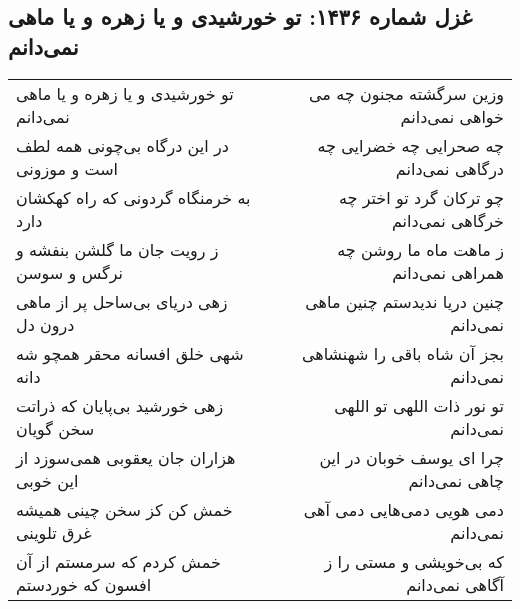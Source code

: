 \begin{center}
\section*{غزل شماره ۱۴۳۶: تو خورشیدی و یا زهره و یا ماهی نمی‌دانم}
\label{sec:1436}
\begin{longtable}{l p{0.5cm} r}
تو خورشیدی و یا زهره و یا ماهی نمی‌دانم
&&
وزین سرگشته مجنون چه می خواهی نمی‌دانم
\\
در این درگاه بی‌چونی همه لطف است و موزونی
&&
چه صحرایی چه خضرایی چه درگاهی نمی‌دانم
\\
به خرمنگاه گردونی که راه کهکشان دارد
&&
چو ترکان گرد تو اختر چه خرگاهی نمی‌دانم
\\
ز رویت جان ما گلشن بنفشه و نرگس و سوسن
&&
ز ماهت ماه ما روشن چه همراهی نمی‌دانم
\\
زهی دریای بی‌ساحل پر از ماهی درون دل
&&
چنین دریا ندیدستم چنین ماهی نمی‌دانم
\\
شهی خلق افسانه محقر همچو شه دانه
&&
بجز آن شاه باقی را شهنشاهی نمی‌دانم
\\
زهی خورشید بی‌پایان که ذراتت سخن گویان
&&
تو نور ذات اللهی تو اللهی نمی‌دانم
\\
هزاران جان یعقوبی همی‌سوزد از این خوبی
&&
چرا ای یوسف خوبان در این چاهی نمی‌دانم
\\
خمش کن کز سخن چینی همیشه غرق تلوینی
&&
دمی هویی دمی‌هایی دمی آهی نمی‌دانم
\\
خمش کردم که سرمستم از آن افسون که خوردستم
&&
که بی‌خویشی و مستی را ز آگاهی نمی‌دانم
\\
\end{longtable}
\end{center}
